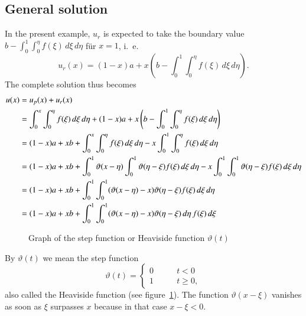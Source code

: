 \subsection{General solution}
In the present example, $u_r$ is expected to take the boundary value
$b-\int_0^1\int_0^\eta f(\xi)\,d\xi\,d\eta$
für $x=1$, i.~e.
\[
u_r(x)=(1-x)a+x\left(b-\int_0^1\int_0^\eta f(\xi)\,d\xi\,d\eta\right).
\]
The complete solution thus becomes
\begin{align}
u(x)&=u_p(x)+u_r(x)\notag
\\
&=\int_0^x\int_0^\eta f(\xi)\,d\xi\,d\eta+(1-x)a+x\left(b-\int_0^1\int_0^\eta f(\xi)\,d\xi\,d\eta\right)\notag
\\
&=
(1-x)a+xb
+\int_0^x\int_0^\eta f(\xi)\,d\xi\,d\eta
-x\int_0^1\int_0^\eta f(\xi)\,d\xi\,d\eta\notag
\\
&=
(1-x)a+xb
+\int_0^1\vartheta(x-\eta)\int_0^1 \vartheta(\eta - \xi)f(\xi)\,d\xi\,d\eta
-x\int_0^1\int_0^1\vartheta(\eta-\xi) f(\xi)\,d\xi\,d\eta\notag
\\
&=
(1-x)a+xb
+\int_0^1\int_0^1
(\vartheta(x-\eta)-x)\vartheta(\eta -\xi)
f(\xi)\,d\xi\,d\eta
\notag
\\
&=
(1-x)a+xb+\int_0^1\int_0^1
(\vartheta(x-\eta)-x)\vartheta(\eta -\xi)
\,d\eta\,
f(\xi)\,d\xi
\label{1dimgreen}
\end{align}
\begin{figure}
\centering
{}
\caption{Graph of the step function or Heaviside function $\vartheta(t)$
\label{elliptic:graph:stepfunction}}
\end{figure}
By $\vartheta(t)$ we mean the step function
\[
\vartheta(t)=\begin{cases}
0&\qquad t<0\\
1&\qquad t\ge 0,
\end{cases}
\]
also called the Heaviside function (see
figure~\ref{elliptic:graph:stepfunction}).
The function $\vartheta(x-\xi)$ vanishes as soon as $\xi$ surpasses
$x$ because in that case $x-\xi<0$.

